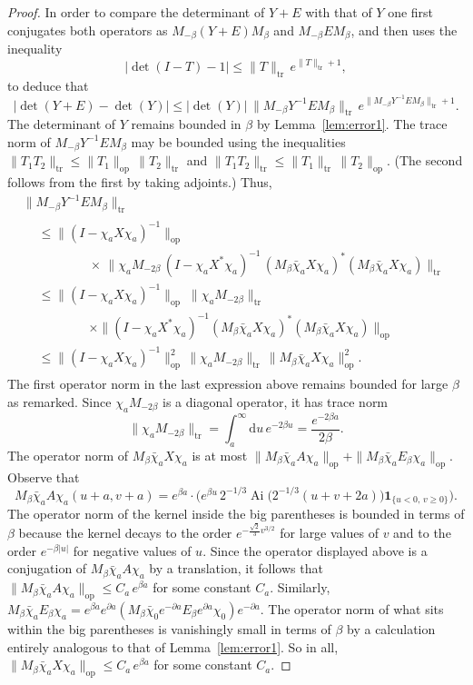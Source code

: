 \documentclass[10pt]{amsart}
\theoremstyle{definition}\newtheorem{defi}[theo]{Definition}\newtheorem{rema}[theo]{Remark}\newtheorem{exam}[theo]{Example}\newtheorem{exem}[theo]{Example}\newtheorem{nota}[theo]{Notation}
\newcommand*{\dd}{\mathrm{d}}
\newcommand*{\du}{\dd u}
\DeclareMathOperator{\tr}{tr}
\DeclareMathOperator{\op}{op}
\DeclareMathOperator{\Ai}{Ai}
\newcommand{\ind}[1]{\mathbf{1}_{\{ #1 \}}}
\begin{document}
\begin{proof}
In order to compare the determinant of $Y+E$ with that of $Y$ one first conjugates both operators as $M_{-\beta}(Y+E) M_{\beta}$ and $M_{-\beta} E M_{\beta}$, and then uses the inequality
\[
\mathopen|\det(I-T) - 1| \leq \|T\|_{\tr}\, e^{\|T\|_{\tr}+1},
\]
to deduce that
\[
\left | \det(Y + E) - \det(Y) \right| \leq
\mathopen| \det(Y)| \, \| M_{-\beta}Y^{-1} E M_{\beta}\|_{\tr} \, e^{\| M_{-\beta}Y^{-1} E M_{\beta}\|_{\tr}+1}.
\]
The determinant of $Y$ remains bounded in $\beta$ by Lemma~\ref{lem:error1}.
\goodbreak
The trace norm of $M_{-\beta}Y^{-1} E M_{\beta}$ may be bounded using the inequalities $\| T_1 T_2 \|_{\tr}\leq \| T_1 \|_{\op}\, \| T_2\|_{\tr}$ and $\| T_1 T_2 \|_{\tr} \leq \| T_1 \|_{\tr}\, \| T_2\|_{\op}$. (The second follows from the first by taking adjoints.) Thus,
\begin{multline}\label{eqn:error2b}
\| M_{-\beta}Y^{-1} E M_{\beta}\|_{\tr}\\
\begin{aligned}
&\leq \|(I - \chi_a X \chi_a)^{-1} \|_{\op} \\
& \qquad\qquad\times \, \|\chi_a M_{-2\beta}\, (I-\chi_a X^{*} \chi_a)^{-1} \, (M_{\beta}\bar{\chi}_aX\chi_a)^{*} (M_{\beta}\bar{\chi}_aX\chi_a)\|_{\tr} \\
& \leq \|(I - \chi_a X \chi_a)^{-1} \|_{\op} \; \|\chi_a M_{-2\beta}\|_{\tr}\\
& \qquad\qquad\times \|(I-\chi_a X^{*} \chi_a)^{-1} (M_{\beta}\bar{\chi}_aX\chi_a)^{*} (M_{\beta}\bar{\chi}_aX\chi_a)\|_{\op} \\
& \leq \|(I - \chi_a X \chi_a)^{-1} \|_{\op}^2 \, \| \chi_a M_{-2\beta} \|_{\tr}\, \| M_{\beta}\bar{\chi}_aX\chi_a\|^2_{\op}.
\end{aligned}
\end{multline}
The first operator norm in the last expression above remains bounded for large $\beta$ as remarked. Since $\chi_a M_{-2\beta}$ is a diagonal operator, it has trace norm
\[
\|\chi_a M_{-2\beta} \|_{\tr} = \int_a^{\infty} \du\, e^{-2\beta u} = \frac{e^{-2\beta a}}{2\beta}.
\]
The operator norm of $M_{\beta}\bar{\chi}_aX\chi_a$ is at most $\| M_{\beta} \bar{\chi}_aA\chi_a\|_{\op} + \|M_{\beta}\bar{\chi}_a E_{\beta} \chi_a\|_{\op}$. Observe that
\[
M_{\beta} \bar{\chi}_aA\chi_a(u+a,v+a) = e^{\beta a} \cdot
\Big(e^{\beta u} \, 2^{-1/3} \Ai \big(2^{-1/3}(u+v+2a)\big) \ind{u <0, \, v \geq 0} \Big).
\]
The operator norm of the kernel inside the big parentheses is bounded in terms of $\beta$ because the kernel decays to the order $e^{-\frac{\sqrt{2}}{3}v^{3/2}}$ for large values of $v$ and to the order $e^{-\beta |u|}$ for negative values of $u$. Since the operator displayed above is a conjugation of $M_{\beta} \bar{\chi}_aA\chi_a$ by a translation, it follows that $\| M_{\beta} \bar{\chi}_aA\chi_a\|_{\op} \leq C_a\, e^{\beta a}$ for some constant $C_a$. Similarly, $M_{\beta}\bar{\chi}_a E_{\beta} \chi_a = e^{\beta a} e^{\partial a}(M_{\beta} \bar{\chi}_0 e^{-\partial a} E_{\beta} e^{\partial a} \chi_0 ) e^{-\partial a}$. The operator norm of what sits within the big parentheses is vanishingly small in terms of $\beta$ by a calculation entirely analogous to that of Lemma~\ref{lem:error1}. So in all, $ \| M_{\beta}\bar{\chi}_aX\chi_a\|_{\op} \leq C_a\, e^{\beta a}$ for some constant $C_a$.


\end{proof}
\end{document}
